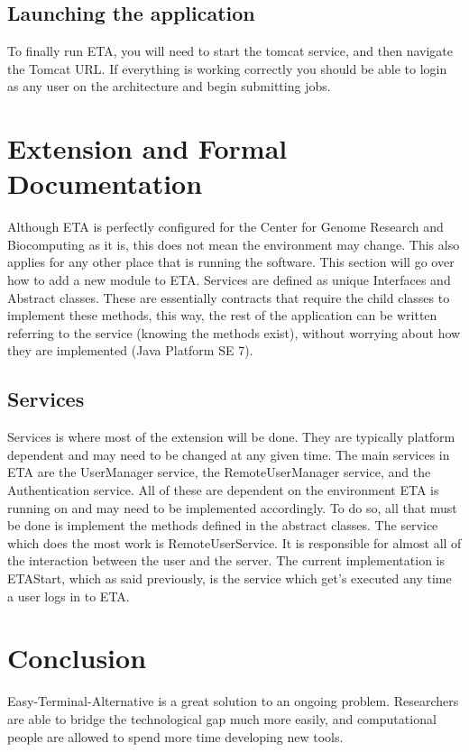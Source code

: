 \documentclass[a4paper,12pt]{article}
\begin{document}
\subsection{Launching the application}

 To finally run ETA, you will need to start the tomcat service, and then navigate the Tomcat URL. If everything is working correctly you should be able to login as any user on the architecture and begin submitting jobs.


\section{Extension and Formal Documentation}
 Although ETA is perfectly configured for the Center for Genome Research and Biocomputing as it is, this does not mean the environment may change. This also applies for any other place that is running the software. This section will go over how to add a new module to ETA. Services are defined as unique Interfaces and Abstract classes. These are essentially contracts that require the child classes to implement these methods, this way, the rest of the application can be written referring to the service (knowing the methods exist), without worrying about how they are implemented (Java Platform SE 7).
\subsection{Services}
 Services is where most of the extension will be done. They are typically platform dependent and may need to be changed at any given time. The main services in ETA are the UserManager service, the RemoteUserManager service, and the Authentication service. All of these are dependent on the environment ETA is running on and may need to be implemented accordingly. To do so, all that must be done is implement the methods defined in the abstract classes.
 The service which does the most work is RemoteUserService. It is responsible for almost all of the interaction between the user and the server. The current implementation is ETAStart, which as said previously, is the service which get's executed any time a user logs in to ETA.
 

\section{Conclusion}
 Easy-Terminal-Alternative is a great solution to an ongoing problem. Researchers are able to bridge the technological gap much more easily, and computational people are allowed to spend more time developing new tools.
 
\end{document}
